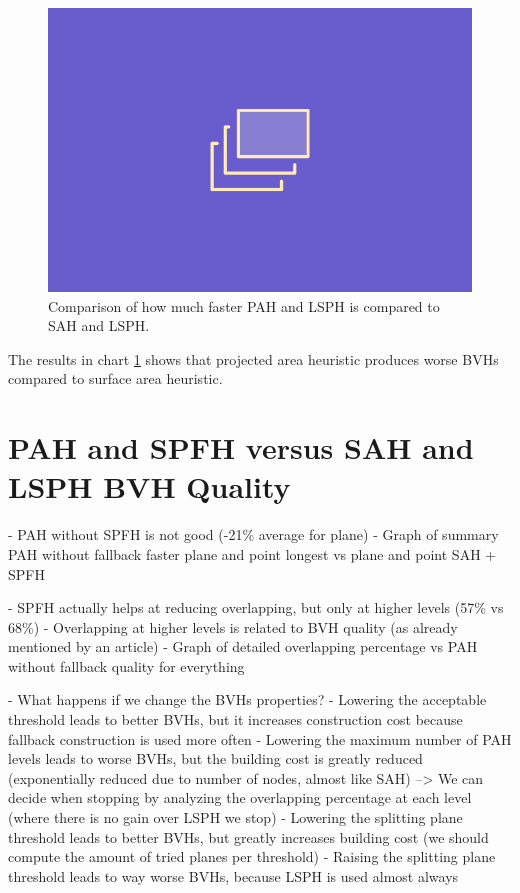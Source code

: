 \documentclass{PoliMi_MasterThesis}
\begin{document}
\begin{figure}[H] 
	\includegraphics[width=\textwidth]{Images/TODO.png}
	\caption{Comparison of how much faster PAH and LSPH is compared to SAH and LSPH.}
	\label{fig:pah_isolation}
\end{figure}

The results in chart \ref{fig:pah_isolation} shows that projected area heuristic produces worse BVHs compared to surface area heuristic.

\section{PAH and SPFH versus SAH and LSPH BVH Quality}
- PAH without SPFH is not good (-21\% average for plane)
	- Graph of summary PAH without fallback faster plane and point longest vs plane and point SAH + SPFH

- SPFH actually helps at reducing overlapping, but only at higher levels (57\% vs 68\%)
- Overlapping at higher levels is related to BVH quality (as already mentioned by an article)
	- Graph of detailed overlapping percentage vs PAH without fallback quality for everything

- What happens if we change the BVHs properties?
	- Lowering the acceptable threshold leads to better BVHs, but it increases construction cost because fallback construction is used more often
	- Lowering the maximum number of PAH levels leads to worse BVHs, but the building cost is greatly reduced (exponentially reduced due to number of nodes, almost like SAH) --> We can decide when stopping by analyzing the overlapping percentage at each level (where there is no gain over LSPH we stop)
	- Lowering the splitting plane threshold leads to better BVHs, but greatly increases building cost (we should compute the amount of tried planes per threshold)
	- Raising the splitting plane threshold leads to way worse BVHs, because LSPH is used almost always
\end{document}
